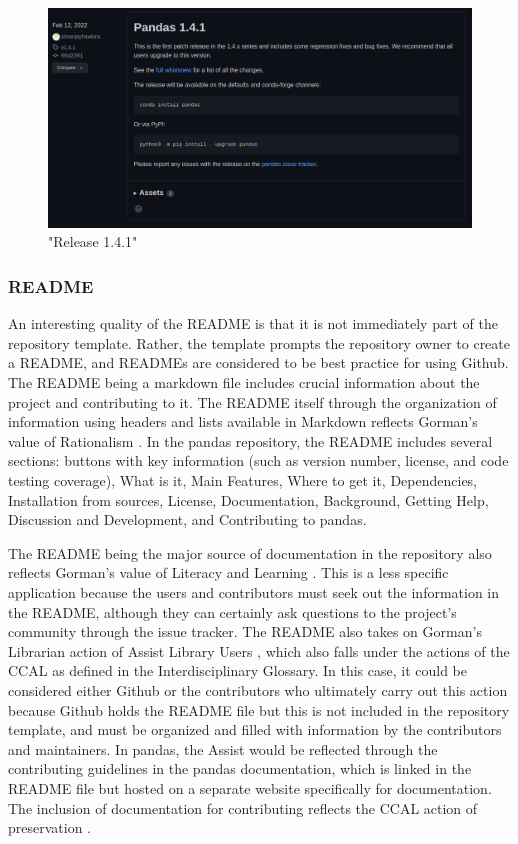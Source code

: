 \begin{figure}[hbt!]
\begin{center}
\includegraphics[width=.8\textwidth]{./images/releases.png}
\caption{"Release 1.4.1"}
\vspace{0in}
\end{center}
\end{figure}

\subsubsection{README}

An interesting quality of the README is that it is not immediately part of the repository template. Rather, the template prompts the repository owner to create a README, and READMEs are considered to be best practice for using Github. The README being a markdown file includes crucial information about the project and contributing to it. The README itself through the organization of information using headers and lists available in Markdown reflects Gorman's value of Rationalism \cite{gorman2000values}. In the pandas repository, the README includes several sections: buttons with key information (such as version number, license, and code testing coverage), What is it, Main Features, Where to get it, Dependencies, Installation from sources, License, Documentation, Background, Getting Help, Discussion and Development, and Contributing to pandas\cite{pandasrepo}. 


The README being the major source of documentation in the repository also reflects Gorman's value of Literacy and Learning \cite{gorman2000values}. This is a less specific application because the users and contributors must seek out the information in the README, although they can certainly ask questions to the project's community through the issue tracker. The README also takes on Gorman's Librarian action of Assist Library Users \cite{gorman2000values}, which also falls under the actions of the CCAL as defined in the Interdisciplinary Glossary. In this case, it could be considered either Github or the contributors who ultimately carry out this action because Github holds the README file but this is not included in the repository template, and must be organized and filled with information by the contributors and maintainers. In pandas, the Assist would be reflected through the contributing guidelines in the pandas documentation, which is linked in the README file but hosted on a separate website specifically for documentation. The inclusion of documentation for contributing reflects the CCAL action of preservation \cite{rubin2016foundationslis}. 

